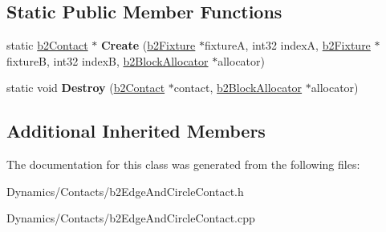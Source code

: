 \subsection*{Static Public Member Functions}
\begin{DoxyCompactItemize}
\item 
\mbox{\label{classb2EdgeAndCircleContact_a1b4a2a1d4098288c84a7778a4949d0f0}} 
static \mbox{\hyperlink{classb2Contact}{b2\+Contact}} $\ast$ {\bfseries Create} (\mbox{\hyperlink{classb2Fixture}{b2\+Fixture}} $\ast$fixtureA, int32 indexA, \mbox{\hyperlink{classb2Fixture}{b2\+Fixture}} $\ast$fixtureB, int32 indexB, \mbox{\hyperlink{classb2BlockAllocator}{b2\+Block\+Allocator}} $\ast$allocator)
\item 
\mbox{\label{classb2EdgeAndCircleContact_a123eeb8144b01fc15c1318eacd0da4ca}} 
static void {\bfseries Destroy} (\mbox{\hyperlink{classb2Contact}{b2\+Contact}} $\ast$contact, \mbox{\hyperlink{classb2BlockAllocator}{b2\+Block\+Allocator}} $\ast$allocator)
\end{DoxyCompactItemize}
\subsection*{Additional Inherited Members}


The documentation for this class was generated from the following files\+:\begin{DoxyCompactItemize}
\item 
Dynamics/\+Contacts/b2\+Edge\+And\+Circle\+Contact.\+h\item 
Dynamics/\+Contacts/b2\+Edge\+And\+Circle\+Contact.\+cpp\end{DoxyCompactItemize}
